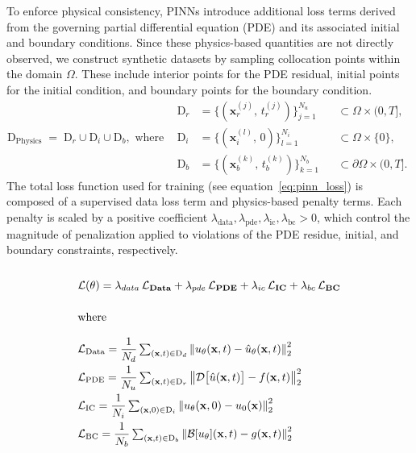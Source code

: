 \documentclass[preprint,12pt]{elsarticle}
\begin{document}
To enforce physical consistency, PINNs introduce additional loss terms derived from the governing partial differential equation (PDE) and its associated initial and boundary conditions. Since these physics-based quantities are not directly observed, we construct synthetic datasets by sampling collocation points within the domain $\Omega$. These include interior points for the PDE residual, initial points for the initial condition, and boundary points for the boundary condition.
\[
\text{D}_{\text{Physics}}
\;=\;
\text{D}_r \cup \text{D}_i \cup \text{D}_b, \text{ where }\ \ 
\begin{aligned}
\text{D}_r &= \bigl\{(\mathbf{x}^{(j)}_r,\, t^{(j)}_r)\bigr\}_{j=1}^{N_u} &&\subset \Omega \times (0,T],\\
\text{D}_i &= \bigl\{(\mathbf{x}^{(l)}_i,\, 0)\bigr\}_{l=1}^{N_i}         &&\subset \Omega \times \{0\},\\
\text{D}_b &= \bigl\{(\mathbf{x}^{(k)}_b,\, t^{(k)}_b)\bigr\}_{k=1}^{N_b} &&\subset \partial\Omega \times (0,T].
\end{aligned}
\]
The total loss function used for training (see equation~\eqref{eq:pinn_loss}) is composed of a supervised data loss term and physics-based penalty terms. Each penalty is scaled by a positive coefficient $\lambda_{\text{data}}, \lambda_{\text{pde}}, \lambda_{\text{ic}}, \lambda_{\text{bc}} > 0$, which control the magnitude of penalization applied to violations of the PDE residue, initial, and boundary constraints, respectively.


\begin{equation}
\renewcommand{\arraystretch}{2.0}  
\begin{array}{@{}l@{}}
\text{\textbf{$
\mathcal{L}(\theta)
= \lambda_{data}\,\mathcal{L}_{\text{Data}}
+ \lambda_{pde}\,\mathcal{L}_{\text{PDE}}
+ \lambda_{ic}\,\mathcal{L}_{\text{IC}}
+ \lambda_{bc}\,\mathcal{L}_{\text{BC}}
$}} \\[1ex]

\text{where} \\[1ex]
\mathcal{L}_{\text{Data}} 
= \dfrac{1}{N_d} \sum_{(\mathbf{x},t)\in\text{D}_d}
  \left\lVert u_{\theta}(\mathbf{x},t) - \hat u_{\theta}(\mathbf{x},t)\right\rVert_2^{2}
\qquad
\\

\mathcal{L}_{\text{PDE}} 
= \dfrac{1}{N_u} \sum_{(\mathbf{x},t)\in\text{D}_r}
  \left\lVert \mathcal{D}\bigl[\hat u(\mathbf{x},t)\bigr] - f(\mathbf{x},t) \right\rVert_2^{2}
\qquad
\\
\mathcal{L}_{\text{IC}} 
= \dfrac{1}{N_i} \sum_{(\mathbf{x},0)\in\text{D}_i}
  \left\lVert u_\theta(\mathbf{x},0) - u_0(\mathbf{x}) \right\rVert_2^{2}
\qquad
\\
\mathcal{L}_{\text{BC}} 
= \dfrac{1}{N_b} \sum_{(\mathbf{x},t)\in\text{D}_b}
  \left\lVert \mathcal{B}[u_\theta](\mathbf{x},t) - g(\mathbf{x},t) \right\rVert_2^{2}
\qquad

\end{array}
\label{eq:pinn_loss}
\end{equation}
\end{document}
